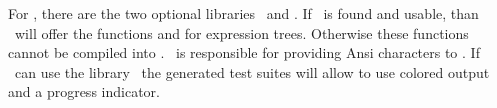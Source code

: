%                                                                        
%                                                                        
%                                                                        
%                                                                        
%
For \projectname, there are the two optional libraries \LibAlgebra~and \LibExtIO. If \LibAlgebra~is found and usable, than \projectname~will offer the functions  and  for expression trees. Otherwise these functions cannot be compiled into \projectname. \LibExtIO~is responsible for providing Ansi characters to \projectname. If \projectname~can use the library \LibExtIO~the generated test suites will allow to use colored output and a progress indicator.
